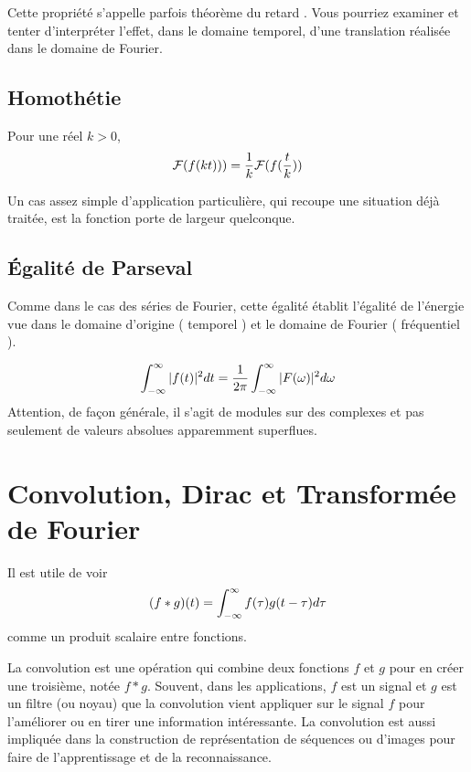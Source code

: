 Cette propriété s'appelle parfois { théorème du retard }.  Vous
pourriez examiner et tenter d'interpréter l'effet, dans le domaine
temporel, d'une translation réalisée dans le domaine de Fourier.

\subsection{Homothétie}
Pour une réel $k>0$,
\begin{equation}
 {\cal F}(f(kt)))=\frac{1}{k}{\cal F}(f(\frac{t}{k}))
\end{equation}

Un cas assez simple d'application particulière, qui recoupe une situation déjà traitée, est la fonction porte de largeur quelconque.

\subsection{Égalité de Parseval}

Comme dans le cas des séries de Fourier, cette égalité établit l'égalité de l'énergie vue dans le domaine d'origine ({ temporel }) et le domaine de Fourier ({ fréquentiel }).

\begin{equation}
  \label{eq:parseval2}
  \int_{-\infty}^{\infty} |f(t)|^2dt=\frac{1}{2\pi}\int_{-\infty}^{\infty}|F(\omega)|^2d\omega
\end{equation}
Attention, de façon générale, il s'agit de modules sur des complexes et pas seulement de valeurs absolues apparemment superflues.

\section{Convolution, Dirac et Transformée de Fourier}

Il est utile de voir 
\begin{equation}
(f*g)(t)=\int_{-\infty}^{\infty} f(\tau)g(t-\tau)d\tau
\end{equation}
comme un produit scalaire entre fonctions.

La convolution est une opération qui combine deux fonctions $f$ et $g$ pour en créer une troisième, notée $f*g$. Souvent, dans les applications, $f$ est un signal et $g$ est un filtre (ou noyau)  que la convolution vient appliquer sur le signal $f$ pour l'améliorer ou en tirer une information intéressante. La convolution est aussi impliquée dans la construction de représentation de séquences ou d'images pour faire de l'apprentissage et de la reconnaissance.

